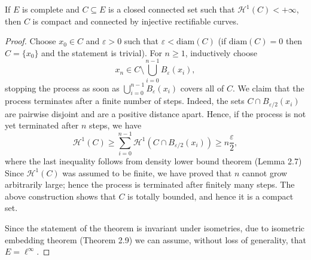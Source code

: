 \documentclass[12pt]{article}
\begin{document}
{\begin{theorem}
    If $E$ is complete and $C \subseteq E$ is a closed connected set such 
    that $\mathcal{H}^1(C) < +\infty$, then $C$ is compact and connected 
    by injective rectifiable curves.
\end{theorem}

\begin{proof}
    Choose $x_0 \in C$ and $\varepsilon > 0$ such that $\varepsilon < \mathrm{diam}(C)$ 
    (if $\mathrm{diam}(C) = 0$ then $C = \{x_0\}$ and the statement is trivial). 
    For $n \geqslant 1$, inductively choose
    \[
        x_n \in C \setminus \bigcup_{i=0}^{n-1} B_{\varepsilon}(x_i),
    \]
    stopping the process as soon as $\bigcup_{i=0}^{n-1} B_{\varepsilon}(x_i)$ covers 
    all of $C$. We claim that the process terminates after a finite number of steps. 
    Indeed, the sets $C \cap B_{\varepsilon/2}(x_i)$ are pairwise disjoint and are a 
    positive distance apart. Hence, if the process is not yet terminated after $n$ 
    steps, we have
    \[
        \mathcal{H}^1(C) \geqslant \sum_{i=0}^{n-1} \mathcal{H}^1\!\left(C \cap 
        B_{\varepsilon/2}(x_i)\right) \geqslant n \frac{\varepsilon}{2},
    \]
    where the last inequality follows from density lower bound theorem (Lemma 2.7) Since $\mathcal{H}^1(C)$ 
    was assumed to be finite, we have proved that $n$ cannot grow arbitrarily 
    large; hence the process is terminated after finitely many steps. The above 
    construction shows that $C$ is totally bounded, and hence it is a compact set.

    Since the statement of the theorem is invariant under isometries, due to 
    isometric embedding theorem (Theorem 2.9) we can assume, without loss of generality, that $E = \ell^\infty$.


\end{proof}}
\end{document}

